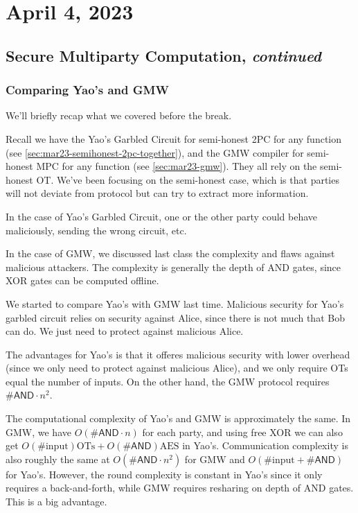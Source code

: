 \section{April 4, 2023}
\label{20230404}
\subsection{Secure Multiparty Computation, \emph{continued}}
\subsubsection{Comparing Yao's and GMW}
We'll briefly recap what we covered before the break.

Recall we have the Yao's Garbled Circuit for semi-honest 2PC for any function (see \cref{sec:mar23-semihonest-2pc-together}), and the GMW compiler for semi-honest MPC for any function (see \cref{sec:mar23-gmw}). They all rely on the semi-honest OT. We've been focusing on the semi-honest case, which is that parties will not deviate from protocol but can try to extract more information.

In the case of Yao's Garbled Circuit, one or the other party could behave maliciously, sending the wrong circuit, etc.

In the case of GMW, we discussed last class the complexity and flaws against malicious attackers. The complexity is generally the depth of \textsf{AND} gates, since \textsf{XOR} gates can be computed offline.

We started to compare Yao's with GMW last time. Malicious security for Yao's garbled circuit relies on security against Alice, since there is not much that Bob can do. We just need to protect against malicious Alice.

The advantages for Yao's is that it offeres malicious security with lower overhead (since we only need to protect against malicious Alice), and we only require OTs equal the number of inputs. On the other hand, the GMW protocol requires $\#\mathsf{AND}\cdot n^2$.

The computational complexity of Yao's and GMW is approximately the same. In GMW, we have $O(\#\mathsf{AND}\cdot n)$ for each party, and using free \textsf{XOR} we can also get $O(\#\text{input}) \text{OTs} + O(\#\mathsf{AND}) \text{AES}$ in Yao's. Communication complexity is also roughly the same at $O(\#\mathsf{AND}\cdot n^2)$ for GMW and $O(\#\text{input} + \#\mathsf{AND})$ for Yao's. However, the round complexity is constant in Yao's since it only requires a back-and-forth, while GMW requires resharing on depth of \textsf{AND} gates. This is a big advantage.


